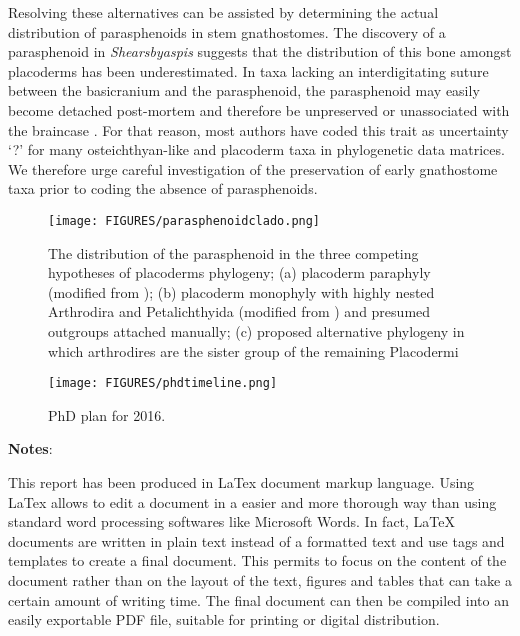 \documentclass[11pt,letterpaper]{report}
\begin{document}
Resolving these alternatives can be assisted by determining the actual distribution of parasphenoids in stem gnathostomes. The discovery of a parasphenoid in \textit{Shearsbyaspis} suggests that the distribution of this bone amongst placoderms has been underestimated. In taxa lacking an interdigitating suture between the basicranium and the parasphenoid, the parasphenoid may easily become detached post-mortem and therefore be unpreserved or unassociated with the braincase \citep{Goujet1984a,carr2010two,Zhu2013}. For that reason, most authors have coded this trait as uncertainty ‘?’ for many osteichthyan-like and placoderm taxa in phylogenetic data matrices. We therefore urge careful investigation of the preservation of early gnathostome taxa prior to coding the absence of parasphenoids.

\begin{figure}[!h]
\centering
    \texttt{[image: FIGURES/parasphenoidclado.png]}
\caption{\footnotesize{The distribution of the parasphenoid in the three competing hypotheses of placoderms phylogeny; (a) placoderm paraphyly (modified from \citealt{giles2015osteichthyan}); (b) placoderm monophyly with highly nested Arthrodira and Petalichthyida (modified from \citealt{GoujetandYoung1995}) and presumed outgroups attached manually; (c) proposed alternative phylogeny in which arthrodires are the sister group of the remaining Placodermi}}
\label{parasphenoidclado}
\end{figure}

\newpage
\begin{center}
\noindent{\huge{\textbf{\textcolor{MidnightBlue}{Phd Timeline and Notes}}}}

\end{center}

\begin{figure}[!htpb]
\hspace{-1cm}
    \texttt{[image: FIGURES/phdtimeline.png]}
\caption{\footnotesize{PhD plan for 2016.}}
\end{figure}

{\large{\textbf{Notes}}}: 

This report has been produced in LaTex document markup language. Using LaTex allows to edit a document in a easier and more thorough way than using standard word processing softwares like Microsoft Words. In fact, LaTeX documents are written in plain text instead of a formatted text and use tags and templates to create a final document. This permits to focus on the content of the document rather than on the layout of the text, figures and tables that can take a certain amount of writing time.
The final document can then be compiled into an easily exportable PDF file, suitable for printing or digital distribution.
\end{document}
